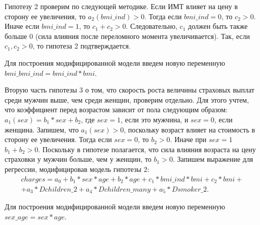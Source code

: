 \documentclass[a4paper,12pt]{article}
\begin{document}
Гипотезу 2 проверим по следующей методике. Если ИМТ влияет на цену в сторону ее увеличения, то $a_2(bmi\_ind) > 0$. Тогда если $bmi\_ind = 0$, то $c_2 > 0$. Иначе если $bmi\_ind = 1$, то $c_1 + c_2 > 0$. Следовательно, $c_1$ должен быть также больше 0 (сила влияния после переломного момента увеличивается). Так, если $c_1, c_2 > 0$, то гипотеза 2 подтверждается.

Для построения модифицированной модели введем новую переменную $bmi\_bmi\_ind = bmi\_ind * bmi$.

Вторую часть гипотезы 3 о том, что скорость роста величины страховых выплат среди мужчин выше, чем среди женщин, проверим отдельно. Для этого учтем, что коэффициент перед возрастом зависит от пола следующим образом: $a_1(sex) = b_1 * sex + b_2$, где $sex = 1$, если это мужчина, и $sex = 0$, если женщина. Запишем, что $a_1(sex) > 0$, поскольку возраст влияет на стоимость в сторону ее увеличения. Тогда если $sex = 0$, то $b_2 > 0$. Иначе при $sex = 1$ $b_1 + b_2 > 0$. Поскольку в гипотезе полагается, что сила влияния возраста на цену страховки у мужчин больше, чем у женщин, то $b_1 > 0$. Запишем выражение для регрессии, модифицировав модель гипотезы 2:
\begin{align*}
charges = a_0 +  b_1 * sex * age + b_2 * age + c_1 * bmi\_ind * bmi + c_2 * bmi + \\ + a_3 * Dchildren\_2 + a_4 * Dchildren\_many + a_5 * Dsmoker\_2.
\end{align*}

Для построения модифицированной модели введем новую переменную $sex\_age = sex * age$.
\end{document}
